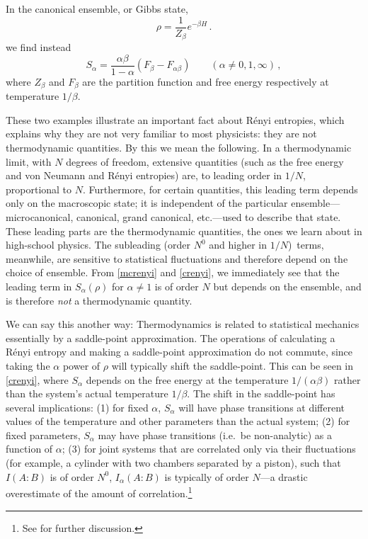 \documentclass[11pt]{article}
\begin{document}
In the canonical ensemble, or Gibbs state,
\begin{equation}
\rho=\frac1{Z_\beta}e^{-\beta H}\,.
\end{equation}
we find instead
\begin{equation}\label{crenyi}
S_\alpha = \frac{\alpha\beta}{1-\alpha}\left(F_\beta-F_{\alpha\beta}\right)\qquad (\alpha\neq0,1,\infty)\,,
\end{equation}
where $Z_\beta$ and $F_\beta$ are the partition function and free energy respectively at temperature $1/\beta$.

These two examples illustrate an important fact about R\'enyi entropies, which explains why they are not very familiar to most physicists: they are not thermodynamic quantities. By this we mean the following. In a thermodynamic limit, with $N$ degrees of freedom, extensive quantities (such as the free energy and von Neumann and R\'enyi entropies) are, to leading order in $1/N$, proportional to $N$. Furthermore, for certain quantities, this leading term depends only on the macroscopic state; it is independent of the particular ensemble---microcanonical, canonical, grand canonical, etc.---used to describe that state. These leading parts are the thermodynamic quantities, the ones we learn about in high-school physics. The subleading (order $N^0$ and higher in $1/N$)\ terms, meanwhile, are sensitive to statistical fluctuations and therefore depend on the choice of ensemble. From \eqref{mcrenyi} and \eqref{crenyi}, we immediately see that the leading term in $S_\alpha(\rho)$ for $\alpha\neq1$ is of order $N$ but depends on the ensemble, and is therefore \emph{not} a thermodynamic quantity.

We can say this another way: Thermodynamics is related to statistical mechanics essentially by a saddle-point approximation. The operations of calculating a R\'enyi entropy and making a saddle-point approximation do not commute, since taking the $\alpha$ power of $\rho$ will typically shift the saddle-point. This can be seen in \eqref{crenyi}, where $S_\alpha$ depends on the free energy at the temperature $1/(\alpha\beta)$ rather than the system's actual temperature $1/\beta$. The shift in the saddle-point has several implications: (1) for fixed $\alpha$, $S_\alpha$ will have phase transitions at different values of the temperature and other parameters than the actual system; (2) for fixed parameters, $S_\alpha$ may have phase transitions (i.e.\ be non-analytic) as a function of $\alpha$; (3) for joint systems that are correlated only via their fluctuations (for example, a cylinder with two chambers separated by a piston), such that $I(A:B)$ is of order $N^0$, $I_\alpha(A:B)$ is typically of order $N$---a drastic overestimate of the amount of correlation.\footnote{See \cite{Headrick:2013zda} for further discussion.}
\end{document}
